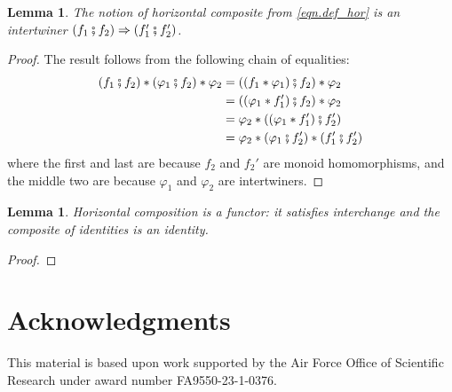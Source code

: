 \documentclass[11pt, one side, article]{memoir}
\theoremstyle{definition}
\theoremstyle{plain}
\newtheorem{lemma}[definitionx]{Lemma}
\newcommand{\then}{\mathbin{\fatsemi}}
\newcommand{\imp}{\Rightarrow}
\newcommand{\0}{\textsf{0}}
\newcommand{\1}{\tn{\textsf{1}}}
\begin{document}
\begin{lemma}
The notion of horizontal composite from \eqref{eqn.def_hor} is an intertwiner $(f_1\then f_2)\imp (f_1'\then f_2')$.
\end{lemma}
\begin{proof}
The result follows from the following chain of equalities:
\begin{align*}
	(f_1\then f_2)*(\varphi_1\then f_2)*\varphi_2&=
	((f_1*\varphi_1)\then f_2)*\varphi_2\\&=
	((\varphi_1*f_1')\then f_2)*\varphi_2\\&=
	\varphi_2*((\varphi_1*f_1')\then f_2')\\&=
	\varphi_2*(\varphi_1\then f_2')*(f_1'\then f_2')
\end{align*}
where the first and last are because $f_2$ and $f_2'$ are monoid homomorphisms, and the middle two are because $\varphi_1$ and $\varphi_2$ are intertwiners.
\end{proof}

\begin{lemma}
Horizontal composition is a functor: it satisfies interchange and the composite of identities is an identity.
\end{lemma}
\begin{proof}

\end{proof}

\section*{Acknowledgments}
This material is based upon work supported by the Air Force Office of Scientific Research under award number FA9550-23-1-0376.

\printbibliography 
\end{document}
